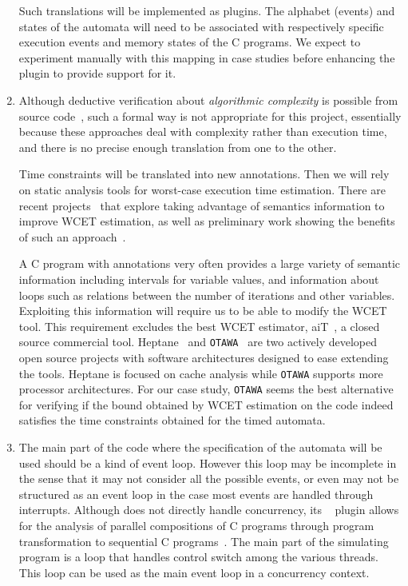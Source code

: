 \begin{enumerate}[labelsep=3pt,leftmargin=12pt]
  Such translations will be implemented as \framac plugins. The
  alphabet (events) and states of the automata will need to be
  associated with respectively specific execution events and memory
  states of the C programs. We expect to experiment manually with this
  mapping in case studies before enhancing the plugin to provide
  support for it.

\item Although deductive verification about {\em algorithmic
    complexity} is possible from source
  code~\cite{WK2009:TYPES,PS2014:SAC,GCP2018:ESOP}, such a formal way
  is not appropriate for this project, essentially because these
  approaches deal with complexity rather than execution time, and
  there is no precise enough translation from one to the other.

  Time constraints will be translated into new \acsl annotations.
  Then we will rely on static analysis tools for worst-case execution
  time estimation. There are recent projects~\cite{MRP2017:WCET} that
  explore taking advantage of semantics information to improve WCET
  estimation, as well as preliminary work showing the benefits of such
  an approach~\cite{BA2014:JRWRTC}.

  A C program with \acsl annotations very often provides a large
  variety of semantic information including intervals for variable
  values, and information about loops such as relations between the
  number of iterations and other variables. Exploiting this
  information will require us to be able to modify the WCET tool.  This
  requirement excludes the best WCET estimator,
  aiT~\cite{FER2004:IPDPS}, a closed source commercial tool.
  Heptane~\cite{HRP2017:WCET} and {\tt OTAWA}~\cite{BCR2010:SEUS} are
  two actively developed open source projects with software
  architectures designed to ease extending the tools. Heptane is
  focused on cache analysis while {\tt OTAWA} supports more processor
  architectures. For our case study, {\tt OTAWA} seems the best
  alternative for verifying if the bound obtained by WCET estimation on
  the code indeed satisfies the time constraints obtained for the timed
  automata.

\item The main part of the code where the specification of the
  automata will be used should be a kind of event loop. However this
  loop may be incomplete in the sense that it may not consider all the
  possible events, or even may not be structured as an event loop in the case
  most events are handled through interrupts. Although \framac does not directly
  handle concurrency, its \conctoseq~\cite{BKL2016:SCAM} plugin allows for the 
  analysis of parallel compositions of C programs through program transformation to sequential C
  programs~\cite{BLK2017:VPT}. The main part of the simulating program
  is a loop that handles control switch among the various
  threads. This loop can be used as the main event loop in a 
  concurrency context.
  
\end{enumerate}



